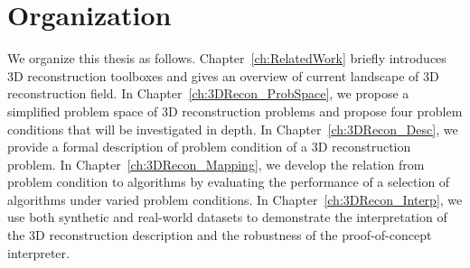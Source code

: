 



\section{Organization}
We organize this thesis as follows. Chapter~\ref{ch:RelatedWork} briefly introduces 3D reconstruction toolboxes and gives an overview of current landscape of 3D reconstruction field. In Chapter~\ref{ch:3DRecon_ProbSpace}, we propose a simplified problem space of 3D reconstruction problems and propose four problem conditions that will be investigated in depth. In Chapter~\ref{ch:3DRecon_Desc}, we provide a formal description of problem condition of a 3D reconstruction problem. In Chapter~\ref{ch:3DRecon_Mapping}, we develop the relation from problem condition to algorithms by evaluating the performance of a selection of algorithms under varied problem conditions. In Chapter~\ref{ch:3DRecon_Interp}, we use both synthetic and real-world datasets to demonstrate the interpretation of the 3D reconstruction description and the robustness of the proof-of-concept interpreter.